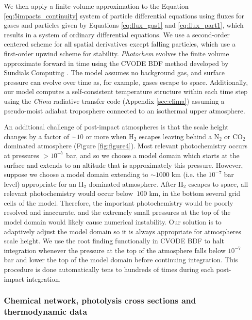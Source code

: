 We then apply a finite-volume approximation to the Equation \eqref{eq:5impacts_continuity} system of particle differential equations using fluxes for gases and particles given by Equations \eqref{eq:flux_gas1} and \eqref{eq:flux_part1}, which results in a system of ordinary differential equations. We use a second-order centered scheme for all spatial derivatives except falling particles, which use a first-order upwind scheme for stability. \emph{Photochem} evolves the finite volume approximate forward in time using the CVODE BDF method developed by Sundials Computing \citep{Hindmarsh_2005}. The model assumes no background gas, and surface pressure can evolve over time as, for example, gases escape to space. Additionally, our model computes a self-consistent temperature structure within each time step using the \emph{Clima} radiative transfer code (Appendix \ref{sec:clima}) assuming a pseudo-moist adiabat troposphere connected to an isothermal upper atmosphere.

An additional challenge of post-impact atmospheres is that the scale height changes by a factor of $\sim 10$ or more when H$_2$ escapes leaving behind a N$_2$ or CO$_2$ dominated atmosphere (Figure \ref{fig:figure4}). Most relevant photochemistry occurs at pressures $> 10^{-7}$ bar, and so we choose a model domain which starts at the surface and extends to an altitude that is approximately this pressure. However, suppose we choose a model domain extending to $\sim 1000$ km (i.e. the $10^{-7}$ bar level) appropriate for an H$_2$ dominated atmosphere. After H$_2$ escapes to space, all relevant photochemistry would occur below $~100$ km, in the bottom several grid cells of the model. Therefore, the important photochemistry would be poorly resolved and inaccurate, and the extremely small pressures at the top of the model domain would likely cause numerical instability. Our solution is to adaptively adjust the model domain so it is always appropriate for atmospheres scale height. We use the root finding functionally in CVODE BDF to halt integration whenever the pressure at the top of the atmosphere falls below $10^{-7}$ bar and lower the top of the model domain before continuing integration. This procedure is done automatically tens to hundreds of times during each post-impact integration.

\subsubsection{Chemical network, photolysis cross sections and thermodynamic data} \label{sec:photochem_reactions}


